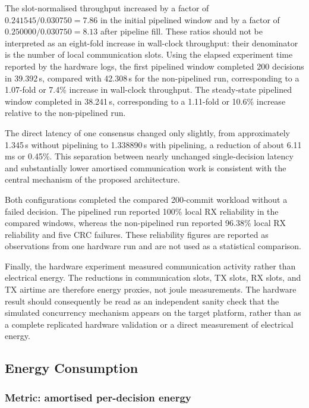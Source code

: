 \documentclass[journal]{IEEEtran}
\begin{document}
The slot-normalised throughput increased by a factor of
$0.241545/0.030750 = 7.86$ in the initial pipelined window and by a factor
of $0.250000/0.030750 = 8.13$ after pipeline fill. These ratios should not
be interpreted as an eight-fold increase in wall-clock throughput: their
denominator is the number of local communication slots. Using the elapsed
experiment time reported by the hardware logs, the first pipelined window
completed 200 decisions in 39.392\,s, compared with 42.308\,s for the
non-pipelined run, corresponding to a 1.07-fold or 7.4\% increase in
wall-clock throughput. The steady-state pipelined window completed in
38.241\,s, corresponding to a 1.11-fold or 10.6\% increase relative to
the non-pipelined run.

The direct latency of one consensus changed only slightly, from
approximately 1.345\,s without pipelining to 1.338890\,s with pipelining,
a reduction of about 6.11\,ms or 0.45\%. This separation between nearly
unchanged single-decision latency and substantially lower amortised
communication work is consistent with the central mechanism of the
proposed architecture.

Both configurations completed the compared 200-commit workload without a
failed decision. The pipelined run reported 100\% local RX reliability in
the compared windows, whereas the non-pipelined run reported 96.38\%
local RX reliability and five CRC failures. These reliability figures are
reported as observations from one hardware run and are not used as a
statistical comparison.

Finally, the hardware experiment measured communication activity rather
than electrical energy. The reductions in communication slots, TX slots,
RX slots, and TX airtime are therefore energy proxies, not joule
measurements. The hardware result should consequently be read as an
independent sanity check that the simulated concurrency mechanism appears
on the target platform, rather than as a complete replicated hardware
validation or a direct measurement of electrical energy.

\subsection{Energy Consumption}
\label{sec:results-energy}

\subsubsection{Metric: amortised per-decision energy}
\end{document}
